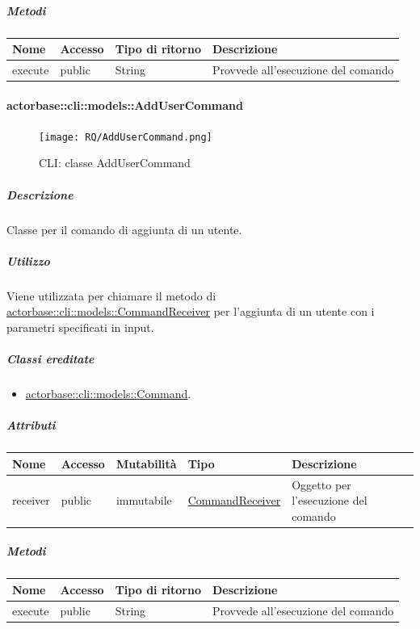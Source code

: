 \documentclass{scalatekids-article}
\begin{document}
\subparagraph{Metodi}

\begin{tabular}{| l | l | l | l |}
  \hline
  Nome & Accesso & Tipo di ritorno & Descrizione\\
  \hline
  execute & public & String & Provvede all'esecuzione del comando\\
  \hline
\end{tabular}

\paragraph{actorbase::cli::models::AddUserCommand}
\label{sec:actorbase::cli::models::AddUserCommand}

\begin{figure}[H]
  \begin{center}
    \texttt{[image: RQ/AddUserCommand.png]}
    \caption{CLI: classe AddUserCommand}
  \end{center}
\end{figure}

\subparagraph{Descrizione}
Classe per il comando di aggiunta di un utente.

\subparagraph{Utilizzo}

Viene utilizzata per chiamare il metodo di
\hyperref[sec:actorbase::cli::models::CommandReceiver]{actorbase::cli::models::CommandReceiver} per l'aggiunta di un utente con i
parametri specificati in input.

\subparagraph{Classi ereditate}

\begin{itemize}
\item \hyperref[sec:actorbase::cli::models::Command]{actorbase::cli::models::Command}.
\end{itemize}

\subparagraph{Attributi}

\begin{tabular}{| p{1cm} | p{1.5cm} | p{2cm} | p{4cm} | p{8.5cm} |}
  \hline
  Nome & Accesso & Mutabilità & Tipo & Descrizione\\
  \hline
  receiver & public & immutabile & \hyperref[sec:actorbase::cli::models::CommandReceiver]{CommandReceiver} & Oggetto per l'esecuzione del comando\\
  \hline
\end{tabular}

\subparagraph{Metodi}

\begin{tabular}{| l | l | l | l |}
  \hline
  Nome & Accesso & Tipo di ritorno & Descrizione\\
  \hline
  execute & public & String & Provvede all'esecuzione del comando\\
  \hline
\end{tabular}
\end{document}
